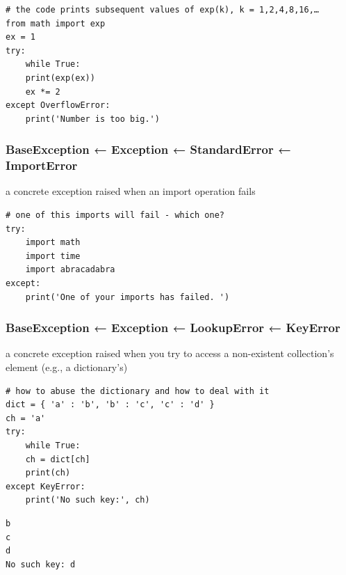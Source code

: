 \documentclass[11pt]{article}
\begin{document}
\begin{verbatim}
# the code prints subsequent values of exp(k), k = 1,2,4,8,16,…
from math import exp
ex = 1
try:
    while True:
	print(exp(ex))
	ex *= 2
except OverflowError:
    print('Number is too big.')

\end{verbatim}

\subsubsection{BaseException ← Exception ← StandardError ← ImportError}
\label{sec:orgdd49115}
a concrete exception raised when an import operation fails

\begin{verbatim}
# one of this imports will fail - which one?
try:
    import math
    import time
    import abracadabra
except:
    print('One of your imports has failed. ')
\end{verbatim}

\subsubsection{BaseException ← Exception ← LookupError ← KeyError}
\label{sec:org353bc9e}
a concrete exception raised when you try to access a non-existent
collection’s element (e.g., a dictionary’s)

\begin{verbatim}
# how to abuse the dictionary and how to deal with it
dict = { 'a' : 'b', 'b' : 'c', 'c' : 'd' }
ch = 'a'
try:
    while True:
	ch = dict[ch]
	print(ch)
except KeyError:
    print('No such key:', ch)

\end{verbatim}

\begin{verbatim}
b
c
d
No such key: d
\end{verbatim}
\end{document}
